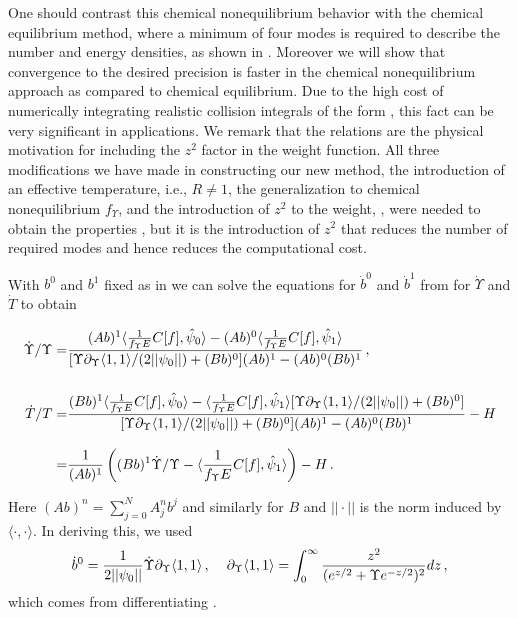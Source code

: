 One should contrast this chemical nonequilibrium behavior  with the chemical equilibrium method, where a minimum of four modes is required to describe the number and energy densities, as shown in .   Moreover we will show that convergence to the desired precision is faster in the chemical nonequilibrium approach as compared to chemical equilibrium. Due to the high cost of numerically integrating realistic collision integrals of the form , this fact can be very significant in applications. We remark that the relations  are the physical motivation for including the $z^2$ factor in the weight function. All three modifications we have made in constructing our new method, the introduction of an effective temperature, i.e., $R\ne 1$, the generalization to chemical nonequilibrium $f_\Upsilon $, and the introduction of $z^2$ to the weight, , were needed to obtain the properties , but it is the introduction of $z^2$ that reduces the number of required modes and hence reduces the computational cost. 

With $b^0$ and $b^1$ fixed as in  we can solve the equations for $\dot b^0$ and $\dot b^1$ from  for $\dot\Upsilon$ and $\dot T$ to obtain

\begin{align}\label{UpsTEqs}
\dot{\Upsilon}/{\Upsilon}=&\frac{(Ab)^1\langle\frac{1}{f_\Upsilon E}C[f],\hat\psi_0\rangle-(Ab)^0\langle\frac{1}{f_\Upsilon E}C[f],\hat\psi_1\rangle }{[\Upsilon\partial_\Upsilon \langle1,1\rangle/(2||\psi_0||)+(Bb)^0](Ab)^1-(Ab)^0(Bb)^1}\,,\\[0.5cm]
\dot{T}/T
=&\frac{(Bb)^1\langle\frac{1}{f_\Upsilon E}C[f],\hat\psi_0\rangle-\langle\frac{1}{f_\Upsilon E}C[f],\hat\psi_1\rangle[\Upsilon\partial_\Upsilon \langle1,1\rangle/(2||\psi_0||)+(Bb)^0]}{[\Upsilon\partial_\Upsilon \langle1,1\rangle/(2||\psi_0||)+(Bb)^0](Ab)^1-(Ab)^0(Bb)^1}-H\notag\\[0.3cm]
=&\frac{1}{(Ab)^1}\left((Bb)^1\dot{\Upsilon}/\Upsilon-\langle\frac{1}{f_\Upsilon E}C[f],\hat\psi_1\rangle\right)-H\,.\label{Teq}
\end{align}

Here $(Ab)^n=\sum_{j=0}^NA^n_jb^j$ and similarly for $B$ and $||\cdot||$ is the norm induced by $\langle\cdot,\cdot\rangle$. In deriving this, we used
\begin{equation}
\dot{b}^0=\frac{1}{2||\psi_0||}\dot\Upsilon\partial_\Upsilon \langle1,1\rangle\,, \hspace{4mm} \partial_\Upsilon \langle1,1\rangle=\int_0^\infty \frac{z^2}{(e^{z/2}+ \Upsilon e^{-z/2})^2}dz\,,
\end{equation}
which comes from differentiating . 
 
